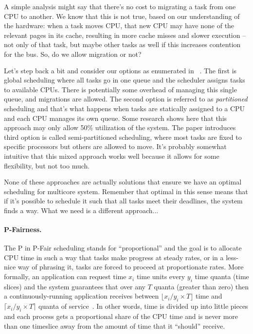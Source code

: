 A simple analysis might say that there's no cost to migrating a task from one CPU to another. We know that this is not true, based on our understanding of the hardware: when a task moves CPU, that new CPU may have none of the relevant pages in its cache, resulting in more cache misses and slower execution -- not only of that task, but maybe other tasks as well if this increases contention for the bus. So, do we allow migration or not?

Let's step back a bit and consider our options as enumerated in ~\cite{globalrts}. The first is global scheduling where all tasks go in one queue and the scheduler assigns tasks to available CPUs. There is potentially some overhead of managing this single queue, and migrations are allowed. The second option is referred to as \textit{partitioned} scheduling and that's what happens when tasks are statically assigned to a CPU and each   CPU manages its own queue. Some research shows here that this approach may only allow 50\% utilization of the system. The paper introduces third option is called semi-partitioned scheduling, where most tasks are fixed to specific processors but others are allowed to move. It's probably somewhat intuitive that this mixed approach works well because it allows for some flexibility, but not too much.

None of these approaches are actually solutions that ensure we have an optimal scheduling for multicore system. Remember that optimal in this sense means that if it's possible to schedule it such that all tasks meet their deadlines, the system finds a way. What we need is a different approach...

\paragraph{P-Fairness.}
The P in P-Fair scheduling stands for ``proportional'' and the goal is to allocate CPU time in such a way that tasks make progress at steady rates, or in a less-nice way of phrasing it, tasks are forced to proceed at proportionate rates. More formally, an application can request time $x_i$ time units every $y_i$ time quanta (time slices) and the system guarantees that over any $T$ quanta (greater than zero) then a continuously-running application receives between $\lfloor x_i/y_i \times T\rfloor$ time and $\lceil x_i/y_i \times T\rceil$ quanta of service~\cite{pfair2}. In other words, time is divided up into little pieces and each process gets a proportional share of the CPU time and is never more than one timeslice away from the amount of time that it ``should'' receive.


